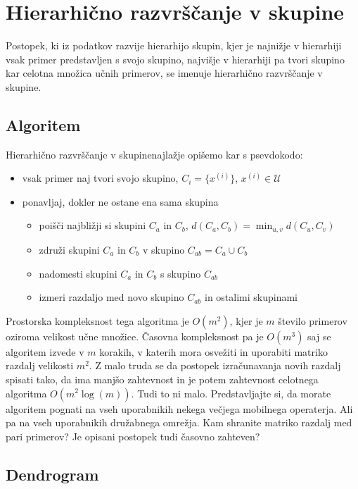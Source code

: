 \section{Hierarhično razvrščanje v skupine}

Postopek, ki iz podatkov razvije hierarhijo skupin, kjer je najnižje v
hierarhiji vsak primer predstavljen s svojo skupino, najvišje v
hierarhiji pa tvori skupino kar celotna množica učnih primerov, se
imenuje hierarhično razvrščanje v skupine.

\subsection{Algoritem}

Hierarhično razvrščanje v skupinenajlažje opišemo kar s psevdokodo:
\begin{itemize}
\item vsak primer naj tvori svojo skupino, $C_i=\{x^{(i)}\}$,
  $x^{(i)}\in\mathcal{U}$
\item ponavljaj, dokler ne ostane ena sama skupina
\begin{itemize}
\item poišči najbližji si skupini $C_a$ in $C_b$,
  $d(C_a,C_b)=\min_{u,v}d(C_u,C_v)$
\item združi skupini $C_a$ in $C_b$ v skupino $C_{ab}=C_a\cup
  C_b$
\item nadomesti skupini $C_a$ in $C_b$ s skupino $C_{ab}$
\item izmeri razdaljo med novo skupino $C_{ab}$ in ostalimi skupinami
\end{itemize}
\end{itemize}

Prostorska kompleksnost tega algoritma je $O(m^2)$, kjer je $m$
število primerov oziroma velikost učne množice. Časovna kompleksnost
pa je $O(m^3)$ saj se algoritem izvede v $m$ korakih, v katerih mora
osvežiti in uporabiti matriko razdalj velikosti $m^2$. Z malo truda se
da postopek izračunavanja novih razdalj spisati tako, da ima manjšo
zahtevnost in je potem zahtevnost celotnega algoritma
$O(m^2\log(m))$. Tudi to ni malo. Predstavljajte si, da morate
algoritem pognati na vseh uporabnikih nekega večjega mobilnega
operaterja. Ali pa na vseh uporabnikih družabnega omrežja. Kam
shranite matriko razdalj med pari primerov? Je opisani postopek tudi
časovno zahteven?

\subsection{Dendrogram}

